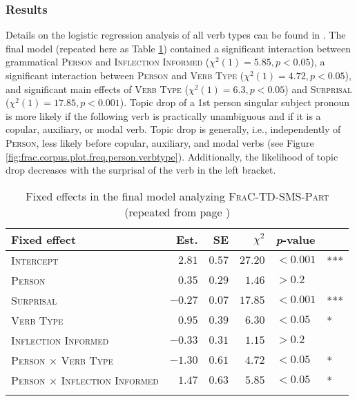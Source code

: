 \subsubsection{Results}
Details on the logistic regression analysis of all verb types can be found in .
The final model (repeated here as Table \ref{tab:frac.mess.part.model.rep}) contained a significant interaction between grammatical \textsc{Person} and \textsc{Inflection Informed} ($\chi^2(1) = 5.85, p < 0.05$), a significant interaction between \textsc{Person} and \textsc{Verb Type} ($\chi^2(1) = 4.72, p < 0.05$), and significant main effects of \textsc{Verb Type} ($\chi^2(1) = 6.3, p < 0.05$) and \textsc{Surprisal} ($\chi^2(1) = 17.85, p < 0.001$).
Topic drop of a 1st person singular subject pronoun is more likely if the following verb is practically unambiguous and if it is a copular, auxiliary, or modal verb.
Topic drop is generally, i.e., independently of \textsc{Person}, less likely before copular, auxiliary, and modal verbs (see Figure \ref{fig:frac.corpus.plot.freq.person.verbtype}).
Additionally, the likelihood of topic drop decreases with the surprisal of the verb in the left bracket.

\begin{table}
\centering
\caption{Fixed effects in the final model analyzing \textsc{FraC-TD-SMS-Part} (repeated from page \pageref{tab:frac.mess.part.model})}
\begin{tabular}{lrrrll}
\lsptoprule
Fixed effect & Est. & SE & $\chi^2$ & \textit{p}-value &   \\
\midrule
\textsc{Intercept} & $2.81$ & $0.57$ & $27.20$ & $< 0.001$ & ***\\
\textsc{Person} & $0.35$ & $0.29$ & $1.46$ & $> 0.2$ & \\
\textsc{Surprisal} & $-0.27$ & $0.07$ & $17.85$ & $< 0.001$ & ***\\
\textsc{Verb Type} & $0.95$ & $0.39$ & $6.30$ & $< 0.05$ & *\\
\textsc{Inflection Informed} & $-0.33$ & $0.31$ & $1.15$ & $> 0.2$ & \\
\textsc{Person $\times$ Verb Type} & $-1.30$ & $0.61$ & $4.72$ & $< 0.05$ & *\\
\textsc{Person $\times$ Inflection Informed} & $1.47$ & $0.63$ & $5.85$ & $< 0.05$ & *\\
\lspbottomrule
\end{tabular}
\label{tab:frac.mess.part.model.rep}
\end{table}

